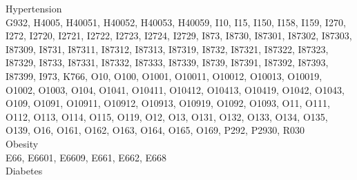 \documentclass[%
 twocolumn,
 reprint,
 amsmath,amssymb,
 aps,nofootinbib
]{revtex4-2}
\begin{document}
Hypertension \\

G932, H4005, H40051, H40052, H40053, H40059, I10, I15, I150, I158, I159, I270, I272, I2720, I2721, I2722, I2723, I2724, I2729, I873, I8730, I87301, I87302, I87303, I87309, I8731, I87311, I87312, I87313, I87319, I8732, I87321, I87322, I87323, I87329, I8733, I87331, I87332, I87333, I87339, I8739, I87391, I87392, I87393, I87399, I973, K766, O10, O100, O1001, O10011, O10012, O10013, O10019, O1002, O1003, O104, O1041, O10411, O10412, O10413, O10419, O1042, O1043, O109, O1091, O10911, O10912, O10913, O10919, O1092, O1093, O11, O111, O112, O113, O114, O115, O119, O12, O13, O131, O132, O133, O134, O135, O139, O16, O161, O162, O163, O164, O165, O169, P292, P2930, R030\\

Obesity\\

E66, E6601, E6609, E661, E662, E668\\

Diabetes\\
\end{document}
